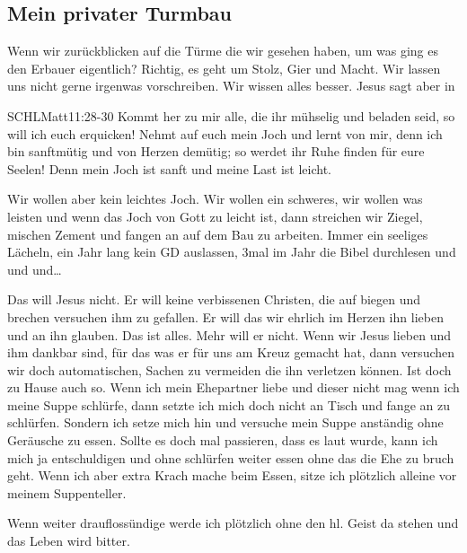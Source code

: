 \documentclass[14pt]{../../inc/mybib}
\newenvironment{block}[1][]{%
  \vspace{1.5em}%
  \noindent\textbf{#1}\par%
  \vspace{0.0em}%
}{%
  \vspace{1em}%
}
\begin{document}
    \subsection{Mein privater Turmbau}
\begin{block}
    Wenn wir zurückblicken auf die Türme die wir gesehen haben, um was ging es den Erbauer eigentlich? Richtig, es geht um Stolz, Gier und Macht. Wir lassen uns nicht gerne irgenwas vorschreiben. Wir wissen alles besser. Jesus sagt aber in  
    \begin{bibelbox}{SCHL}{Matt}{11:28-30}
        Kommt her zu mir alle, die ihr mühselig und beladen seid, so will ich euch erquicken!
        Nehmt auf euch mein Joch und lernt von mir, denn ich bin sanftmütig und von Herzen demütig; so werdet ihr Ruhe finden für eure Seelen!
        Denn mein Joch ist sanft und meine Last ist leicht.
    \end{bibelbox}  
    Wir wollen aber kein leichtes Joch. Wir wollen ein schweres, wir wollen was leisten und wenn das Joch von Gott zu leicht ist, dann streichen wir Ziegel, mischen Zement und fangen an auf dem Bau zu arbeiten. Immer ein seeliges Lächeln, ein Jahr lang kein GD auslassen, 3mal im Jahr die Bibel durchlesen und und und\dots
\end{block}
\begin{block}
    Das will Jesus nicht. Er will keine verbissenen Christen, die auf biegen und brechen versuchen ihm zu gefallen. Er will das wir ehrlich im Herzen ihn lieben und an ihn glauben. Das ist alles. Mehr will er nicht. Wenn wir Jesus lieben und ihm dankbar sind, für das was er für uns am Kreuz gemacht hat, dann versuchen wir doch automatischen, Sachen zu vermeiden die ihn verletzen können. Ist doch zu Hause auch so. Wenn ich mein Ehepartner liebe und dieser nicht mag wenn ich meine Suppe schlürfe, dann setzte ich mich doch nicht an Tisch und fange an zu schlürfen. Sondern ich setze mich hin und versuche mein Suppe anständig ohne Geräusche zu essen. Sollte es doch mal passieren, dass es laut wurde, kann ich mich ja entschuldigen und ohne schlürfen weiter essen ohne das die Ehe zu bruch geht. Wenn ich aber extra Krach mache beim Essen, sitze ich plötzlich alleine vor meinem Suppenteller.

    Wenn weiter drauflossündige werde ich plötzlich ohne den hl. Geist da stehen und das Leben wird bitter.
\end{block}
\end{document}
